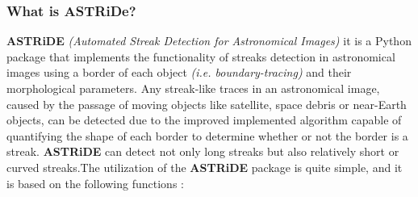 \documentclass[11pt]{article}
\begin{document}
\subsubsection{What is ASTRiDe?}
\textbf{ASTRiDE} \textit{(Automated Streak Detection for Astronomical Images)} it is a Python package that implements the functionality
of streaks detection in astronomical images using a border of each object \textit{(i.e.
boundary-tracing)} and their morphological parameters. Any streak-like traces
in an astronomical image, caused by the passage of moving objects like satellite,
space debris or near-Earth objects, can be detected due to the improved implemented
algorithm capable of quantifying the shape of each border to determine
whether or not the border is a streak. \textbf{ASTRiDE}  can detect not only long streaks
but also relatively short or curved streaks.The utilization of the \textbf{ASTRiDE} package is quite simple, and it is based on the
following functions \cite{lavezzi}:
\end{document}
